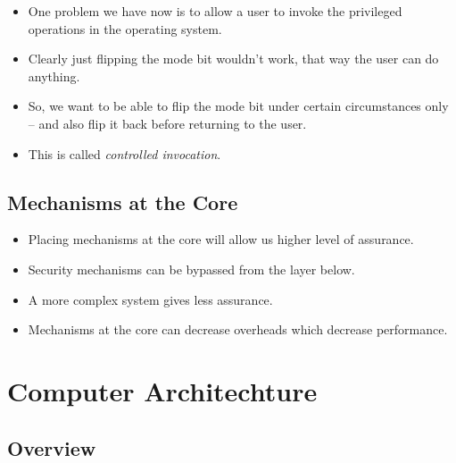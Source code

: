 \documentclass{beamer}
\begin{document}
\begin{frame}{\insertsubsectionhead}
  \begin{itemize}
    \item One problem we have now is to allow a user to invoke the privileged 
      operations in the operating system.

    \item Clearly just flipping the mode bit wouldn't work, that way the user 
      can do anything.

    \item So, we want to be able to flip the mode bit under certain 
      circumstances only -- and also flip it back before returning to the user.

    \item This is called \emph{controlled invocation}.
  \end{itemize}
\end{frame}

\subsection{Mechanisms at the Core}

\begin{frame}{\insertsubsectionhead}
  \begin{itemize}
    \item Placing mechanisms at the core will allow us higher level of 
      assurance.

    \item Security mechanisms can be bypassed from the layer below.

    \item A more complex system gives less assurance.

    \item Mechanisms at the core can decrease overheads which decrease 
      performance.
  \end{itemize}
\end{frame}


\section{Computer Architechture}

\subsection{Overview}

\begin{frame}{\insertsubsectionhead}
\end{frame}
\end{document}
